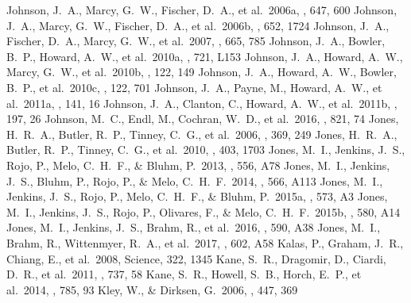 \documentclass[twocolumn]{aastex62}
\begin{document}
\begin{CJK*}{UTF8}{min}
\begin{thebibliography}{}
 Johnson, J.~A., Marcy, G.~W., Fischer, D.~A., et al.\ 2006a, \apj, 647, 600
 Johnson, J.~A., Marcy, G.~W., Fischer, D.~A., et al.\ 2006b, \apj, 652, 1724
 Johnson, J.~A., Fischer, D.~A., Marcy, G.~W., et al.\ 2007, \apj, 665, 785
 Johnson, J.~A., Bowler, B.~P., Howard, A.~W., et al.\ 2010a, \apjl, 721, L153
 Johnson, J.~A., Howard, A.~W., Marcy, G.~W., et al.\ 2010b, \pasp, 122, 149
 Johnson, J.~A., Howard, A.~W., Bowler, B.~P., et al.\ 2010c, \pasp, 122, 701
 Johnson, J.~A., Payne, M., Howard, A.~W., et al.\ 2011a, \aj, 141, 16
 Johnson, J.~A., Clanton, C., Howard, A.~W., et al.\ 2011b, \apjs, 197, 26
 Johnson, M.~C., Endl, M., Cochran, W.~D., et al.\ 2016, \apj, 821, 74
 Jones, H.~R.~A., Butler, R.~P., Tinney, C.~G., et al.\ 2006, \mnras, 369, 249
 Jones, H.~R.~A., Butler, R.~P., Tinney, C.~G., et al.\ 2010, \mnras, 403, 1703
 Jones, M.~I., Jenkins, J.~S., Rojo, P., Melo, C.~H.~F., \& Bluhm, P.\ 2013, \aap, 556, A78
 Jones, M.~I., Jenkins, J.~S., Bluhm, P., Rojo, P., \& Melo, C.~H.~F.\ 2014, \aap, 566, A113
 Jones, M.~I., Jenkins, J.~S., Rojo, P., Melo, C.~H.~F., \& Bluhm, P.\ 2015a, \aap, 573, A3
 Jones, M.~I., Jenkins, J.~S., Rojo, P., Olivares, F., \& Melo, C.~H.~F.\ 2015b, \aap, 580, A14
 Jones, M.~I., Jenkins, J.~S., Brahm, R., et al.\ 2016, \aap, 590, A38
 Jones, M.~I., Brahm, R., Wittenmyer, R.~A., et al.\ 2017, \aap, 602, A58
 Kalas, P., Graham, J.~R., Chiang, E., et al.\ 2008, Science, 322, 1345
 Kane, S.~R., Dragomir, D., Ciardi, D.~R., et al.\ 2011, \apj, 737, 58
 Kane, S.~R., Howell, S.~B., Horch, E.~P., et al.\ 2014, \apj, 785, 93
 Kley, W., \& Dirksen, G.\ 2006, \aap, 447, 369

\end{thebibliography}
\end{CJK*}
\end{document}
